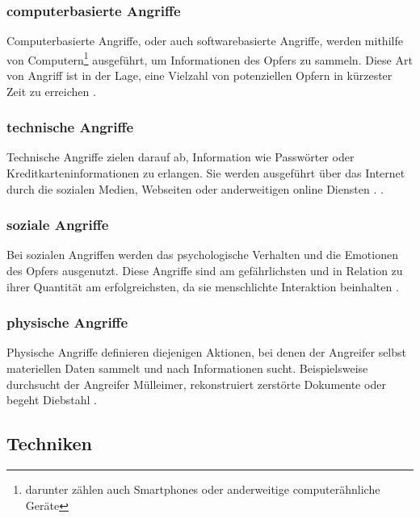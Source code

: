 \subsubsection{computerbasierte Angriffe}
Computerbasierte Angriffe, oder auch softwarebasierte Angriffe, werden mithilfe von Computern\footnote{darunter zählen auch Smartphones oder anderweitige computerähnliche Geräte}
ausgeführt, um Informationen des Opfers zu sammeln. Diese Art von Angriff ist in der Lage, eine Vielzahl
von potenziellen Opfern in kürzester Zeit zu erreichen .

\subsubsection{technische Angriffe}
\label{technisch}
Technische Angriffe zielen darauf ab, Information wie Passwörter oder Kreditkarteninformationen zu erlangen. Sie werden ausgeführt über das Internet durch die sozialen Medien,
Webseiten oder anderweitigen online Diensten . .

\subsubsection{soziale Angriffe}
Bei sozialen Angriffen werden das psychologische Verhalten und die Emotionen des Opfers ausgenutzt. Diese Angriffe sind am gefährlichsten und in Relation zu ihrer Quantität am
erfolgreichsten, da sie menschlichte Interaktion beinhalten .

\subsubsection{physische Angriffe}
Physische Angriffe definieren diejenigen Aktionen, bei denen der Angreifer selbst materiellen Daten sammelt und nach Informationen sucht.
Beispielsweise durchsucht der Angreifer Mülleimer,
rekonstruiert zerstörte Dokumente oder begeht Diebstahl .

\subsection{Techniken}

